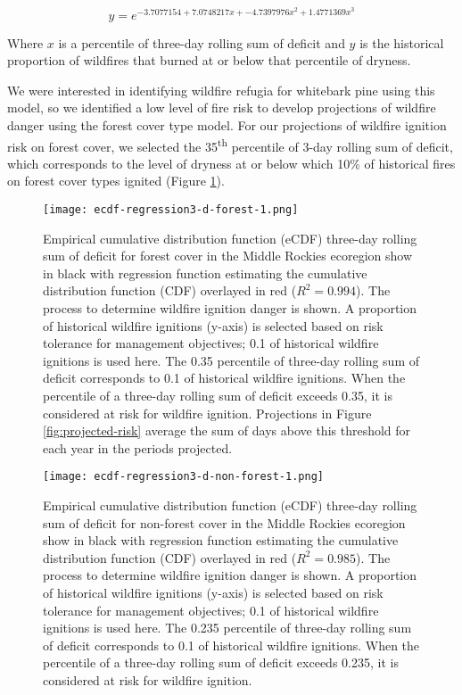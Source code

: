 \documentclass[11p]{article}
\begin{document}
\begin{equation*}
  y = e^{-3.7077154 + 7.0748217x + -4.7397976x^2 + 1.4771369x^3}
\end{equation*}

Where $x$ is a percentile of three-day rolling sum of deficit and $y$ is the historical proportion of wildfires that burned at or below that percentile of dryness.

We were interested in identifying wildfire refugia for whitebark pine using this model, so we identified a low level of fire risk to develop projections of wildfire danger using the forest cover type model. For our projections of wildfire ignition risk on forest cover, we selected the 35\textsuperscript{th} percentile of 3-day rolling sum of deficit, which corresponds to the level of dryness at or below which 10\% of historical fires on forest cover types ignited (Figure \ref{fig:ecdf-forest}). 

\begin{figure}[!htbp]
  \centering
  \texttt{[image: ecdf-regression3-d-forest-1.png]}
  \caption{Empirical cumulative distribution function (eCDF) three-day rolling sum of deficit for forest cover in the Middle Rockies ecoregion show in black with regression function estimating the cumulative distribution function (CDF) overlayed in red ($R^2 = 0.994$). The process to determine wildfire ignition danger is shown. A proportion of historical wildfire ignitions (y-axis) is selected based on risk tolerance for management objectives; 0.1 of historical wildfire ignitions is used here. The 0.35 percentile of three-day rolling sum of deficit corresponds to 0.1 of historical wildfire ignitions. When the percentile of a three-day rolling sum of deficit exceeds 0.35, it is considered at risk for wildfire ignition. Projections in Figure \ref{fig:projected-risk} average the sum of days above this threshold for each year in the periods projected.}
  \label{fig:ecdf-forest}
\end{figure}

\begin{figure}[!htbp]
  \centering
  \texttt{[image: ecdf-regression3-d-non-forest-1.png]}
  \caption{Empirical cumulative distribution function (eCDF) three-day rolling sum of deficit for non-forest cover in the Middle Rockies ecoregion show in black with regression function estimating the cumulative distribution function (CDF) overlayed in red ($R^2 = 0.985$). The process to determine wildfire ignition danger is shown. A proportion of historical wildfire ignitions (y-axis) is selected based on risk tolerance for management objectives; 0.1 of historical wildfire ignitions is used here. The 0.235 percentile of three-day rolling sum of deficit corresponds to 0.1 of historical wildfire ignitions. When the percentile of a three-day rolling sum of deficit exceeds 0.235, it is considered at risk for wildfire ignition.}
  \label{fig:ecdf-non-forest}
\end{figure}
\end{document}
